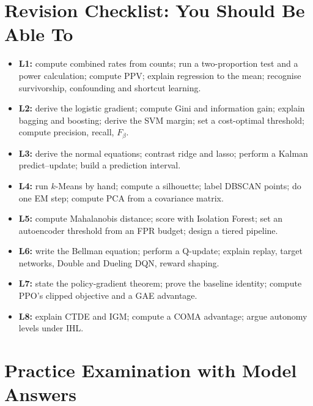 \documentclass[11pt]{article}
\begin{document}
\section{Revision Checklist: You Should Be Able To}
\begin{itemize}
\item \textbf{L1:} compute combined rates from counts; run a two-proportion test and a power calculation; compute PPV; explain regression to the mean; recognise survivorship, confounding and shortcut learning.
\item \textbf{L2:} derive the logistic gradient; compute Gini and information gain; explain bagging and boosting; derive the SVM margin; set a cost-optimal threshold; compute precision, recall, $F_\beta$.
\item \textbf{L3:} derive the normal equations; contrast ridge and lasso; perform a Kalman predict--update; build a prediction interval.
\item \textbf{L4:} run $k$-Means by hand; compute a silhouette; label DBSCAN points; do one EM step; compute PCA from a covariance matrix.
\item \textbf{L5:} compute Mahalanobis distance; score with Isolation Forest; set an autoencoder threshold from an FPR budget; design a tiered pipeline.
\item \textbf{L6:} write the Bellman equation; perform a Q-update; explain replay, target networks, Double and Dueling DQN, reward shaping.
\item \textbf{L7:} state the policy-gradient theorem; prove the baseline identity; compute PPO's clipped objective and a GAE advantage.
\item \textbf{L8:} explain CTDE and IGM; compute a COMA advantage; argue autonomy levels under IHL.
\end{itemize}

\section{Practice Examination with Model Answers}
\end{document}
